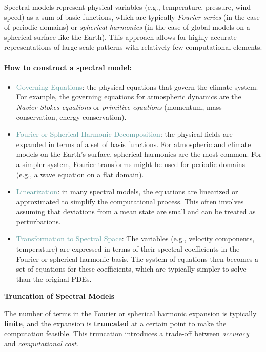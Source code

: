 Spectral models represent physical variables (e.g., temperature, pressure, wind speed) as a sum of basic functions, which are typically \textit{Fourier series} (in the case of periodic domains) or \textit{spherical harmonics} (in the case of global models on a spherical surface like the Earth). This approach allows for highly accurate representations of large-scale patterns with relatively few computational elements.

\paragraph{\textbf{How to construct a spectral model}:}
\begin{itemize}
    \item \textcolor{CadetBlue}{Governing Equations}: the physical equations that govern the climate system. For example, the governing equations for atmospheric dynamics are the \textit{Navier-Stokes equations} or \textit{primitive equations} (momentum, mass conservation, energy conservation).
    \item \textcolor{CadetBlue}{Fourier or Spherical Harmonic Decomposition}: the physical fields are expanded in terms of a set of basis functions. For atmospheric and climate models on the Earth's surface, spherical harmonics are the most common. For a simpler system, Fourier transforms might be used for periodic domains (e.g., a wave equation on a flat domain).
    \item \textcolor{CadetBlue}{Linearization}: in many spectral models, the equations are linearized or approximated to simplify the computational process. This often involves assuming that deviations from a mean state are small and can be treated as perturbations.
    \item \textcolor{CadetBlue}{Transformation to Spectral Space}: The variables (e.g., velocity components, temperature) are expressed in terms of their spectral coefficients in the Fourier or spherical harmonic basis. The system of equations then becomes a set of equations for these coefficients, which are typically simpler to solve than the original PDEs.
\end{itemize}

\textbf{Truncation of Spectral Models}

The number of terms in the Fourier or spherical harmonic expansion is typically \textbf{finite}, and the expansion is \textbf{truncated} at a certain point to make the computation feasible. This truncation introduces a trade-off between \textit{accuracy} and \textit{computational cost}.

